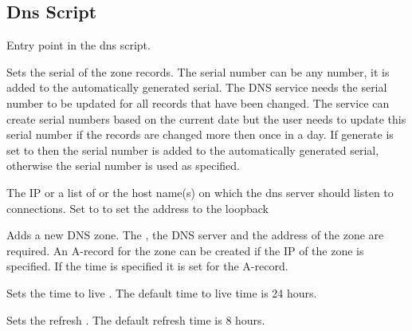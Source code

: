 \subsection{Dns Script}



Entry point in the dns script.


Sets the serial  of the zone records.
The serial number can be any number, it is added to the automatically
generated serial. The DNS service needs the serial number to be updated
for all records that have been changed. The service can create serial
numbers based on the current date but the user needs to update this
serial number if the records are changed more then once in a day.
If generate is set to  then the serial number is added to
the automatically generated serial, otherwise the serial number is used 
as specified.

\TheStatement*[dns!bind]{bind [address: [\Arg{loopback}] [\Arg{all}] [\Arg{address}] [addresses: \Arg{addresses}]}

The IP  or a list of  or the host name(s) 
on which the dns server should listen to connections. Set to 
to set the address to the loopback 


Adds a new DNS zone. The , the  DNS server and 
the  address of the zone are required. An A-record for the zone
can be created if the IP  of the zone is specified. If the
 time is specified it is set for the A-record.


Sets the time to live . The default time to live time is 24 hours.


Sets the refresh . The default refresh time is 8 hours.

